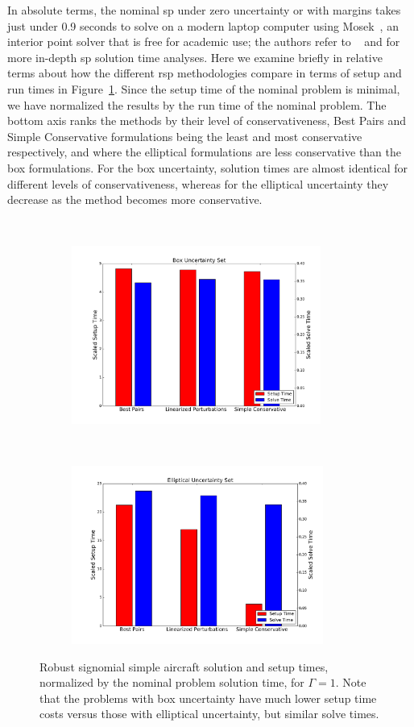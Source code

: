 In absolute
terms, the nominal \gls{sp} under zero uncertainty or with margins
takes just under 0.9 seconds to solve on a modern laptop computer using Mosek~\cite{mosek},
an interior point solver that is free for academic use; the authors
refer to ~\cite{Kirschen2018Log} and \cite{York2018} for more in-depth \gls{sp} solution time analyses.
Here we examine briefly in relative terms about how the different \gls{rsp} methodologies compare in terms of setup and
run times in Figure~\ref{compare_signomial}. Since the setup time of the nominal problem is minimal,
we have normalized the results by the run time of the nominal problem.
The bottom axis ranks the methods by their level of conservativeness, Best Pairs
and Simple Conservative formulations being the least and most conservative respectively,
and where the elliptical formulations are less conservative than the box formulations.
For the box uncertainty, solution times are almost identical for different levels of conservativeness,
whereas for the elliptical uncertainty they decrease as the method becomes more conservative.

\ \\
\begin{figure}[ht]
    \centering
    \captionsetup{justification=centering, font=small}
    \begin{subfigure}{0.49\textwidth}
        \centering
        \includegraphics[height=2.3in]{signomial_simple_flight/box_sst.pdf}
    \end{subfigure}
    ~
    \begin{subfigure}{0.49\textwidth}
        \centering
        \includegraphics[height=2.3in]{signomial_simple_flight/ell_sst.pdf}
    \end{subfigure}
    \caption{Robust signomial simple aircraft solution and setup times, normalized by the
    nominal problem solution time, for $\Gamma = 1$.
    Note that the problems with box uncertainty have much lower setup
    time costs versus those with elliptical uncertainty, but similar solve times.}
    \label{compare_signomial}
\end{figure}

